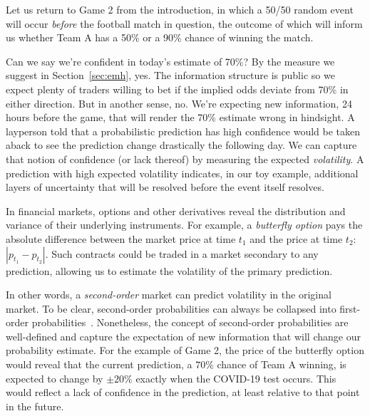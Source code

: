 \documentclass[sigconf,anonymous]{aamas}   %
\begin{document}
Let us return to Game 2 from the introduction, in which a 50/50 random event will occur \emph{before} the football match in question, the outcome of which will inform us whether Team A has a 50\% or a 90\% chance of winning the match.

Can we say we're confident in today's estimate of 70\%?
By the measure we suggest in Section~\ref{sec:emh}, yes.
The information structure is public so we expect plenty of traders willing to bet if the implied odds deviate from 70\% in either direction.
But in another sense, no.
We're expecting new information, 24 hours before the game, that will render the 70\% estimate wrong in hindsight.
A layperson 
told that a probabilistic prediction has high confidence would be taken aback to see the prediction change drastically the following day.
We can capture that notion of confidence (or lack thereof) by measuring the expected \emph{volatility}.
A prediction with high expected volatility indicates, in our toy example, additional layers of uncertainty that will be resolved before the event itself resolves.

In financial markets, options and other derivatives reveal the distribution and variance of their underlying instruments. 
For example, a \emph{butterfly option} %
pays the absolute difference between the market price at time $t_1$ and the price at time $t_2$: $|p_{t_1}-p_{t_2}|$. 
Such contracts could be traded in a market secondary to any prediction, %
allowing us to estimate the %
volatility of the primary prediction.

In other words, a %
\emph{second-order} market can predict volatility in the original market.
To be clear, second-order probabilities can always be collapsed into first-order probabilities~\cite{pearl1987}.
Nonetheless, the concept of second-order probabilities are well-defined and capture the expectation of new information that will change our probability estimate.
For the example of Game 2, the price of the butterfly option would reveal that the current prediction, a $70\%$ chance of Team A winning, is expected to change by $\pm 20\%$ exactly when the COVID-19 test occurs.
This would reflect a lack of confidence in the prediction, at least relative to that point in the future.
\end{document}
